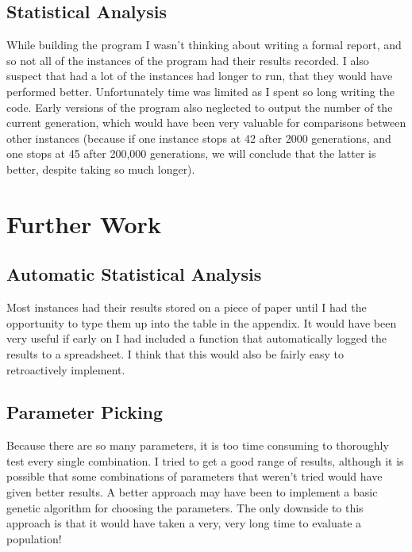 \documentclass[]{report}
\begin{document}
\subsection{Statistical Analysis}
While building the program I wasn't thinking about writing a formal report, and so not all of the instances of the program had their results recorded. I also suspect that had a lot of the instances had longer to run, that they would have performed better. Unfortunately time was limited as I spent so long writing the code. Early versions of the program also neglected to output the number of the current generation, which would have been very valuable for comparisons between other instances (because if one instance stops at 42 after 2000 generations, and one stops at 45 after 200,000 generations, we will conclude that the latter is better, despite taking so much longer).

\section{Further Work}
\subsection{Automatic Statistical Analysis}
Most instances had their results stored on a piece of paper until I had the opportunity to type them up into the table in the appendix. It would have been very useful if early on I had included a function that automatically logged the results to a spreadsheet. I think that this would also be fairly easy to retroactively implement.

\subsection{Parameter Picking}
Because there are so many parameters, it is too time consuming to thoroughly test every single combination. I tried to get a good range of results, although it is possible that some combinations of parameters that weren't tried would have given better results. A better approach may have been to implement a basic genetic algorithm for choosing the parameters. The only downside to this approach is that it would have taken a very, very long time to evaluate a population!
\end{document}
